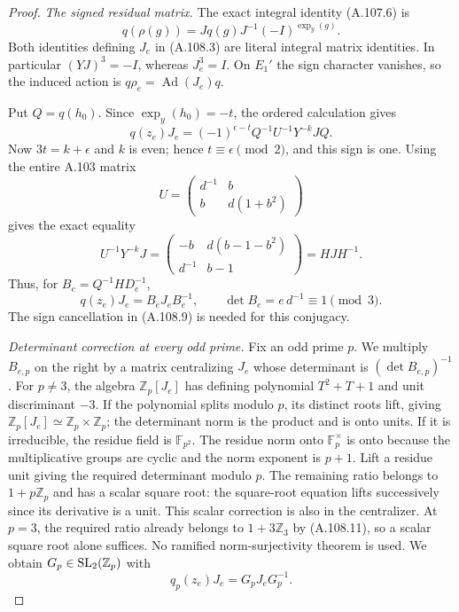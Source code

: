 \begin{proof}
\emph{The signed residual matrix.}
The exact integral identity (A.107.6) is
\[
 q(\rho(g))=Jq(g)J^{-1}(-I)^{\operatorname{exp}_y(g)}.
\]
Both identities defining \(J_e\) in (A.108.3) are literal integral
matrix identities. In particular \((YJ)^3=-I\), whereas \(J_e^3=I\).
On \(E_1'\) the sign character vanishes, so the induced action is
\(q\rho_e=\operatorname{Ad}(J_e)q\).

Put \(Q=q(h_0)\). Since \(\operatorname{exp}_y(h_0)=-t\), the
ordered calculation gives
\[
 q(z_e)J_e=(-1)^{\epsilon-t}Q^{-1}U^{-1}Y^{-k}JQ.
 \tag{A.108.9}
\]
Now \(3t=k+\epsilon\) and \(k\) is even; hence
\(t\equiv\epsilon\pmod2\), and this sign is one.
Using the entire A.103 matrix
\[
 U=\begin{pmatrix}d^{-1}&b\\b&d(1+b^2)\end{pmatrix}
\]
gives the exact equality
\[
 U^{-1}Y^{-k}J
   =\begin{pmatrix}-b&d(b-1-b^2)\\d^{-1}&b-1\end{pmatrix}
   =HJH^{-1}.
 \tag{A.108.10}
\]
Thus, for \(B_e=Q^{-1}HD_e^{-1}\),
\[
 q(z_e)J_e=B_eJ_eB_e^{-1},\qquad
 \det B_e=e\,d^{-1}\equiv1\pmod3.
 \tag{A.108.11}
\]
The sign cancellation in (A.108.9) is needed for this conjugacy.

\emph{Determinant correction at every odd prime.}
Fix an odd prime \(p\). We multiply \(B_{e,p}\) on the right by
a matrix centralizing \(J_e\) whose determinant is
\((\det B_{e,p})^{-1}\).
For \(p\ne3\), the algebra \(\mathbb Z_p[J_e]\) has defining
polynomial \(T^2+T+1\) and unit discriminant \(-3\).
If the polynomial splits modulo \(p\), its distinct roots lift,
giving \(\mathbb Z_p[J_e]\simeq\mathbb Z_p\times\mathbb Z_p\);
the determinant norm is the product and is onto units.
If it is irreducible, the residue field is \(\mathbb F_{p^2}\).
The residue norm onto \(\mathbb F_p^\times\) is onto because the
multiplicative groups are cyclic and the norm exponent is \(p+1\).
Lift a residue unit giving the required determinant modulo \(p\).
The remaining ratio belongs to \(1+p\mathbb Z_p\) and has a scalar
square root: the square-root equation lifts successively since
its derivative is a unit. This scalar correction is also in the
centralizer.
At \(p=3\), the required ratio already belongs to \(1+3\mathbb Z_3\)
by (A.108.11), so a scalar square root alone suffices.
No ramified norm-surjectivity theorem is used.
We obtain \(G_p\in{\rm SL}_2(\mathbb Z_p)\) with
\[
 q_p(z_e)J_e=G_pJ_eG_p^{-1}.
 \tag{A.108.12}
\]


\end{proof}
